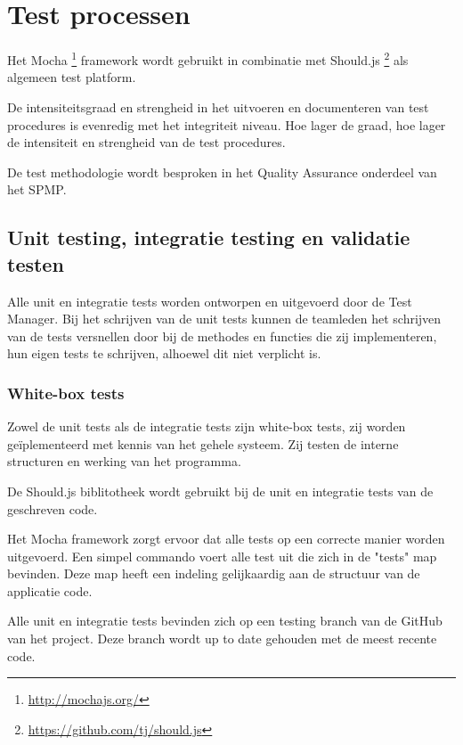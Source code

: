 \documentclass[a4paper]{article}
\begin{document}
\section{Test processen}

Het Mocha \footnote{\url{http://mochajs.org/}} framework wordt gebruikt in combinatie met Should.js \footnote{\url{https://github.com/tj/should.js}} als algemeen test platform.\newline

De intensiteitsgraad en strengheid in het uitvoeren en documenteren van test procedures is evenredig met het integriteit niveau. Hoe lager de graad, hoe lager de intensiteit en strengheid van de test procedures.\newline

De test methodologie wordt besproken in het Quality Assurance onderdeel van het SPMP.

\subsection{Unit testing, integratie testing en validatie testen}

Alle unit en integratie tests worden ontworpen en uitgevoerd door de Test Manager. Bij het schrijven van de unit tests kunnen de teamleden het schrijven van de tests versnellen door bij de methodes en functies die zij implementeren, hun eigen tests te schrijven, alhoewel dit niet verplicht is.\newline


\subsubsection{White-box tests}

Zowel de unit tests als de integratie tests zijn white-box tests, zij worden geïplementeerd met kennis van het gehele systeem. Zij testen de interne structuren en werking van het programma.\newline

De Should.js biblitotheek wordt gebruikt bij de unit en integratie tests van de geschreven code.

Het Mocha framework zorgt ervoor dat alle tests op een correcte manier worden uitgevoerd. Een simpel commando voert alle test uit die zich in de "tests" map bevinden. Deze map heeft een indeling gelijkaardig aan de structuur van de applicatie code.

Alle unit en integratie tests bevinden zich op een testing branch van de GitHub van het project. Deze branch wordt up to date gehouden met de meest recente code.
\end{document}
